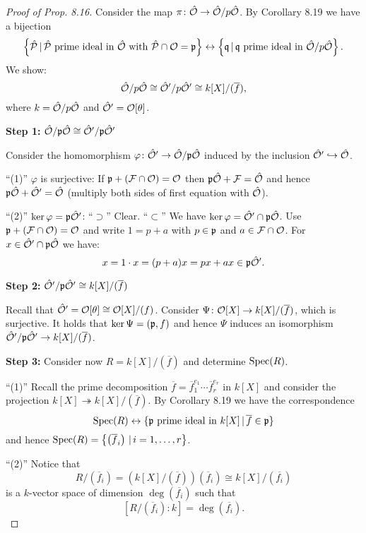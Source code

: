\begin{proof}[Proof of Prop. 8.16]
Consider the map $\pi \colon \hat{\mathcal{O}} \to \hat{\mathcal{O}} / p\hat{\mathcal{O}}$. By Corollary 8.19 we have a bijection
\[ \left\{ \hat{\mathcal{P}} \, | \, \hat{\mathcal{P}} \text{ prime ideal in } \hat{\mathcal{O}} \text{ with }
\hat{\mathcal{P}} \cap \mathcal{O} = \mathfrak{p} \right\}
\leftrightarrow \left\{ \mathfrak{q} \, | \, \mathfrak{q} \text{ prime ideal in } \hat{\mathcal{O}} / p\hat{\mathcal{O}}
\right\}.
\]
We show:
\[ \hat{\mathcal{O}} / p\hat{\mathcal{O}}
\cong \hat{\mathcal{O}}' / p\hat{\mathcal{O}}'
\cong k[X] / (\overline{f}),
\]
where $k = \hat{\mathcal{O}} / p\hat{\mathcal{O}}$ and $\hat{\mathcal{O}}' = \mathcal{O}[\theta]$.

\bigskip \textbf{Step 1:} $\hat{\mathcal{O}} / \mathfrak{p}\hat{\mathcal{O}} \cong \hat{\mathcal{O}}' / \mathfrak{p}\hat{\mathcal{O}}'$

Consider the homomorphism $\varphi \colon \hat{\mathcal{O}}' \to \hat{\mathcal{O}} / \mathfrak{p}\hat{\mathcal{O}}$ induced by the inclusion $\hat{\mathcal{O}}' \hookrightarrow \hat{\mathcal{O}}$.

\bigskip
\enquote{(1)} $\varphi$ is surjective:
If $\mathfrak{p} + (\mathcal{F} \cap \mathcal{O}) = \mathcal{O}$ then $\mathfrak{p}\hat{\mathcal{O}} + \mathcal{F} = \hat{\mathcal{O}}$ and hence $\mathfrak{p}\hat{\mathcal{O}}+ \hat{\mathcal{O}}' = \hat{\mathcal{O}}$ (multiply both sides of first equation with $\hat{\mathcal{O}}$).

\bigskip
\enquote{(2)} $\ker \varphi = \mathfrak{p} \hat{\mathcal{O}}'$:
\enquote{$\supset$} Clear.
\enquote{$\subset$} We have $\ker \varphi = \hat{\mathcal{O}}' \cap \mathfrak{p} \hat{\mathcal{O}}$.
Use $\mathfrak{p} +(\mathcal{F} \cap \mathcal{O}) = \mathcal{O}$ and write $1 = p+a$ with $p \in \mathfrak{p}$ and $a \in \mathcal{F} \cap \mathcal{O}$.
For $x \in \hat{\mathcal{O}}' \cap \mathfrak{p}\hat{\mathcal{O}}$ we have:
\[ x = 1\cdot x = (p+a)x = px +ax \in \mathfrak{p} \hat{\mathcal{O}}'.
\]

\bigskip \textbf{Step 2:} $\hat{\mathcal{O}}' / \mathfrak{p}\hat{\mathcal{O}}' \cong k[X] / (\overline{f})$

Recall that $\hat{\mathcal{O}}' = \mathcal{O}[\theta] \cong \mathcal{O}[X] / (f)$. Consider
$\Psi \colon \mathcal{O}[X] \to k[X] / (\overline{f})$, which is surjective. It holds that
$\ker \Psi = (\mathfrak{p}, f)$ and hence $\Psi$ induces an isomorphism 
$\hat{\mathcal{O}} ' / \mathfrak{p} \hat{\mathcal{O}}' \to k[X] / (\overline{f})$.


\bigskip \textbf{Step 3:}
Consider now $R =  k[X] / (\overline{f})$ and determine $\operatorname{Spec}(R)$.

\bigskip
\enquote{(1)} 
Recall the prime decomposition $\overline{f} = \overline{f}_1^{e_1} \cdots \overline{f}_r^{e_r}$ in $k[X]$ and consider the projection $k[X] \twoheadrightarrow 
k[X] / (\overline{f})$. By Corollary 8.19 we have the correspondence
\[ \operatorname{Spec}(R) \leftrightarrow 
\{ \mathfrak{p} \text{ prime ideal in } k[X] \, | \, \overline{f} \in \mathfrak{p} \}
\]
and hence $\operatorname{Spec}(R)= \left\{ \left(  \overline{f}_i \right) \, | \, i = 1, \dots, r  \right\}$.

\bigskip
\enquote{(2)} 
Notice that
\[ R / \left(  \overline{f}_i \right)
= \left(  k[X] / (\overline{f}) \right) \left(  \overline{f}_i \right)
\cong k[X] / (\overline{f_i})
\]
is a $k$-vector space of dimension $\deg (\overline{f_i})$ such that
\[  \left[  R / \left(  \overline{f}_i \right)  \colon k \right]
= \deg (\overline{f_i}).
\]


\end{proof}
